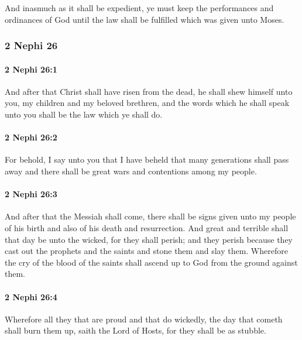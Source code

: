			And inasmuch as it shall be expedient,
			ye must keep the performances and ordinances of God
			until the law shall be fulfilled which was given unto Moses.

	\subsubsection{2 Nephi 26} %
		\label{2NEPHI-26}
		
		\paragraph{2 Nephi 26:1} %
			\label{2NEPHI-26-1}

			And after that Christ shall have risen from the dead,
			he shall shew himself unto you, my children and my beloved brethren,
			and the words which he shall speak unto you shall be the law which ye shall do.

		\paragraph{2 Nephi 26:2} %
			\label{2NEPHI-26-2}

			For behold, I say unto you that I have beheld
			that many generations shall pass away
			and there shall be great wars and contentions among my people.

		\paragraph{2 Nephi 26:3} %
			\label{2NEPHI-26-3}

			And after that the Messiah shall come,
			there shall be signs given unto my people of his birth
			and also of his death and resurrection.
			And great and terrible shall that day be unto the wicked,
			for they shall perish;
			and they perish because they cast out the prophets and the saints
			and stone them and slay them.
			Wherefore the cry of the blood of the saints
			shall ascend up to God from the ground against them.

		\paragraph{2 Nephi 26:4} %
			\label{2NEPHI-26-4}

			Wherefore all they that are proud and that do wickedly,
			the day that cometh shall burn them up, saith the Lord of Hosts,
			for they shall be as stubble.


